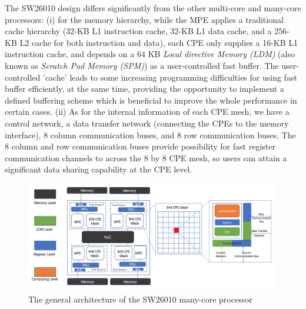 \documentclass[10pt,journal,compsoc]{IEEEtran}
\begin{document}
The SW26010 design differs significantly from the other multi-core and many-core processors: (i) for the memory hierarchy, while the MPE applies a traditional cache hierarchy (32-KB L1 instruction cache, 32-KB L1 data cache, and a 256-KB L2 cache for both instruction and data), each CPE only supplies a 16-KB L1 instruction cache, and depends on a 64 KB \emph{Local directive Memory (LDM)} (also known as \emph{Scratch Pad Memory (SPM)}) as a user-controlled fast buffer. The user-controlled 'cache' leads to some increasing programming difficulties for using fast buffer efficiently, at the same time, providing the opportunity to implement a defined buffering scheme which is beneficial to improve the whole performance in certain cases. (ii) As for the internal information of each CPE mesh, we have a control network, a data transfer network (connecting the CPEs to the memory interface), 8 column communication buses, and 8 row communication buses. The 8 column and row communication buses provide possibility for fast register communication channels to across the 8 by 8 CPE mesh, so users can attain a significant data sharing capability at the CPE level. 

\begin{figure}
\centering
\includegraphics[scale=0.28]{Sunway.png}
\caption{The general architecture of the SW26010 many-core processor}
\label{figure:f1}
\end{figure} 
\end{document}
